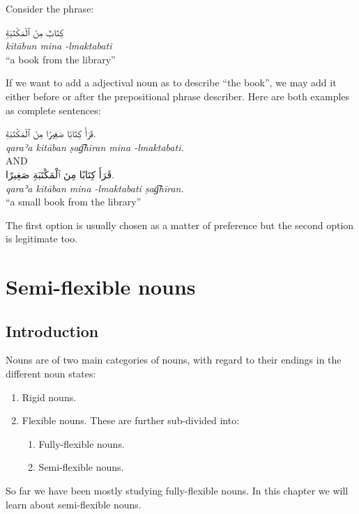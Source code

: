 \documentclass[
  10pt,
]{book}
\providecommand{\tightlist}{%
  \setlength{\itemsep}{0pt}\setlength{\parskip}{0pt}}
\begin{document}
Consider the phrase:

\foreignlanguage{arabic}{کِتَابٌ مِنَ ٱلْمَکْتَبَةِ}\\
\emph{kitābun mina -lmaktabati}\\
\enquote{a book from the library}

If we want to add a adjectival noun as to describe \enquote{the book}, we may add it either before or after the prepositional phrase describer. Here are both examples as complete sentences:

\foreignlanguage{arabic}{قَرَأَ کِتَابًا صَغِيرًا مِنَ ٱلْمَکْتَبَةِ.}\\
\emph{qaraʾa kitāban ṣag͡hīran mina -lmaktabati.}\\
AND\\
\foreignlanguage{arabic}{قَرَأَ کِتَابًا مِنَ ٱلْمَکْتَبَةِ صَغِيرًا.}\\
\emph{qaraʾa kitāban mina -lmaktabati ṣag͡hīran.}\\
\enquote{a small book from the library}

The first option is usually chosen as a matter of preference but the second option is legitimate too.

\chapter{Semi-flexible nouns}\label{semi-flexible-nouns}

\section{Introduction}\label{introduction-6}

Nouns are of two main categories of nouns, with regard to their endings in the different noun states:

\begin{enumerate}
\def\labelenumi{\arabic{enumi}.}
\tightlist
\item
  Rigid nouns.
\item
  Flexible nouns. These are further sub-divided into:

  \begin{enumerate}
  \def\labelenumii{\roman{enumii}.}
  \tightlist
  \item
    Fully-flexible nouns.
  \item
    Semi-flexible nouns.
  \end{enumerate}
\end{enumerate}

So far we have been mostly studying fully-flexible nouns. In this chapter we will learn about semi-flexible nouns.
\end{document}

